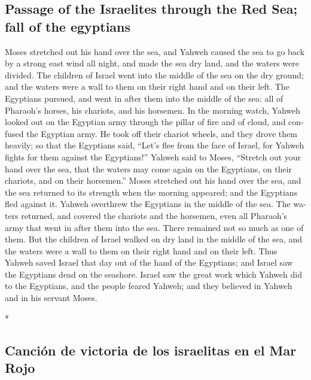 \begin{paracol}{2}
\begin{otherlanguage}{english}
\hypertarget{passage-of-the-israelites-through-the-red-sea-fall-of-the-egyptians}{%
\subsection{Passage of the Israelites through the Red Sea; fall of the
egyptians}\label{passage-of-the-israelites-through-the-red-sea-fall-of-the-egyptians}}

 Moses stretched out his hand over the sea, and Yahweh
caused the sea to go back by a strong east wind all night, and made the
sea dry land, and the waters were divided.  The children
of Israel went into the middle of the sea on the dry ground; and the
waters were a wall to them on their right hand and on their left.
 The Egyptians pursued, and went in after them into the
middle of the sea: all of Pharaoh's horses, his chariots, and his
horsemen.  In the morning watch, Yahweh looked out on the
Egyptian army through the pillar of fire and of cloud, and confused the
Egyptian army.  He took off their chariot wheels, and
they drove them heavily; so that the Egyptians said, ``Let's flee from
the face of Israel, for Yahweh fights for them against the Egyptians!''
 Yahweh said to Moses, ``Stretch out your hand over the
sea, that the waters may come again on the Egyptians, on their chariots,
and on their horsemen.''  Moses stretched out his hand
over the sea, and the sea returned to its strength when the morning
appeared; and the Egyptians fled against it. Yahweh overthrew the
Egyptians in the middle of the sea.  The waters returned,
and covered the chariots and the horsemen, even all Pharaoh's army that
went in after them into the sea. There remained not so much as one of
them.  But the children of Israel walked on dry land in
the middle of the sea, and the waters were a wall to them on their right
hand and on their left.  Thus Yahweh saved Israel that
day out of the hand of the Egyptians; and Israel saw the Egyptians dead
on the seashore.  Israel saw the great work which Yahweh
did to the Egyptians, and the people feared Yahweh; and they believed in
Yahweh and in his servant Moses.

\end{otherlanguage}

\switchcolumn[0]*

\hypertarget{canciuxf3n-de-victoria-de-los-israelitas-en-el-mar-rojo}{%
\subsection{Canción de victoria de los israelitas en el Mar
Rojo}\label{canciuxf3n-de-victoria-de-los-israelitas-en-el-mar-rojo}}


\end{paracol}
